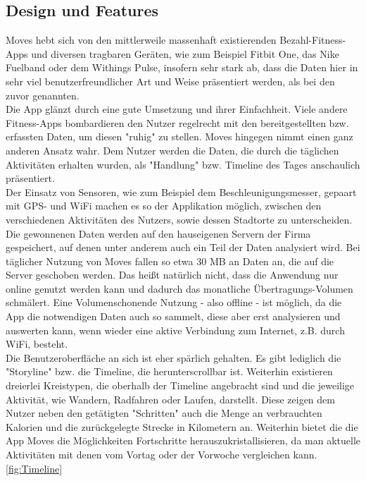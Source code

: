 \subsection{Design und Features}
\label{ch:Apps:sec:Moves:subsec:DuF}

Moves hebt sich von den mittlerweile massenhaft existierenden Bezahl-Fitness-Apps und diversen tragbaren Geräten, wie zum Beispiel Fitbit One, das Nike Fuelband oder dem Withings Pulse, insofern sehr stark ab, dass die Daten hier in sehr viel benutzerfreundlicher Art und Weise präsentiert werden, als bei den zuvor genannten.
\\
Die App glänzt durch eine gute Umsetzung und ihrer Einfachheit. 
Viele andere Fitness-Apps bombardieren den Nutzer regelrecht mit den bereitgestellten bzw. erfassten Daten, um diesen "ruhig" zu stellen. 
Moves hingegen nimmt einen ganz anderen Ansatz wahr. 
Dem Nutzer werden die Daten, die durch die täglichen Aktivitäten erhalten wurden, als "Handlung" bzw. Timeline des Tages anschaulich präsentiert.
\\
Der Einsatz von Sensoren, wie zum Beispiel dem Beschleunigungsmesser, gepaart mit GPS- und WiFi machen es so der Applikation möglich, zwischen den verschiedenen Aktivitäten des Nutzers, sowie dessen Stadtorte zu unterscheiden. 
Die gewonnenen Daten werden auf den hauseigenen Servern der Firma gespeichert, auf denen unter anderem auch ein Teil der Daten analysiert wird. 
Bei täglicher Nutzung von Moves fallen so etwa 30 MB an Daten an, die auf die Server geschoben werden. 
Das heißt natürlich nicht, dass die Anwendung nur online genutzt werden kann und dadurch das monatliche Übertragungs-Volumen schmälert. 
Eine Volumenschonende Nutzung - also offline - ist möglich, da die App die notwendigen Daten auch so sammelt, diese aber erst analysieren und auswerten kann, wenn wieder eine aktive Verbindung zum Internet, z.B. durch WiFi, besteht.   
\\
Die Benutzeroberfläche an sich ist eher spärlich gehalten. 
Es gibt lediglich die "Storyline" bzw. die Timeline, die herunterscrollbar ist. 
Weiterhin existieren dreierlei Kreistypen, die oberhalb der Timeline angebracht sind und die jeweilige Aktivität, wie Wandern, Radfahren oder Laufen, darstellt. 
Diese zeigen dem Nutzer neben den getätigten "Schritten" auch die Menge an verbrauchten Kalorien und die zurückgelegte Strecke in Kilometern an. 
Weiterhin bietet die die App Moves die Möglichkeiten Fortschritte herauszukristallisieren, da man aktuelle Aktivitäten mit denen vom Vortag oder der Vorwoche vergleichen kann.   
\\
\ref{fig:Timeline}

